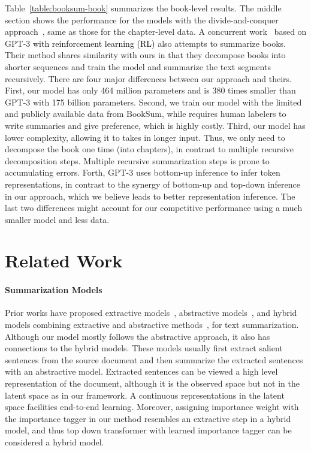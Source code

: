 \documentclass{article} \usepackage{iclr2022_conference,times}
\begin{document}
Table~\ref{table:booksum-book} summarizes the book-level results. The middle section shows the performance for the models with the divide-and-conquer approach~\citep{kryscinski2021booksum}, same as those for the chapter-level data. A concurrent work~\citep{wu2021recursively} based on GPT-3 \textcolor{black}{with reinforcement learning (RL)} also attempts to summarize books. Their method shares similarity with ours in that they decompose books into shorter sequences and train the model and summarize the text segments recursively. There are four major differences between our approach and theirs. First, our model has only 464 million parameters and is 380 times smaller than GPT-3 with 175 billion parameters. Second, we train our model with the limited and publicly available data from BookSum, while \cite{wu2021recursively} requires human labelers to write summaries and give preference, which is highly costly. Third, our model has lower complexity, allowing it to takes in longer input. Thus, we only need to decompose the book one time (into chapters), in contrast to multiple recursive decomposition steps. Multiple recursive summarization steps is prone to accumulating errors. Forth, GPT-3 uses bottom-up inference to infer token representations, in contrast to the synergy of bottom-up and top-down inference in our approach, which we believe leads to better representation inference. The last two differences might account for our competitive performance using a much smaller model and less data. 



\section{Related Work}

\paragraph{Summarization Models}
Prior works have proposed extractive models~\citep{nallapati2017summarunner, cui-hu-2021-sliding}, abstractive models~\citep{nallapati2016abstractive, zhang2020pegasus}, and hybrid models combining extractive and abstractive methods~\citep{gehrmann-etal-2018-bottom, pilault-etal-2020-extractive}, for text summarization. Although our model mostly follows the abstractive approach, it also has connections to the hybrid models. These models usually first extract salient sentences from the source document and then summarize the extracted sentences with an abstractive model. Extracted sentences can be viewed a high level representation of the document, although it is the observed space but not in the latent space as in our framework. A continuous representations in the latent space facilities end-to-end learning. Moreover, assigning importance weight with the importance tagger in our method resembles an extractive step in a hybrid model, and thus top down transformer with learned importance tagger can be considered a hybrid model. 
\end{document}
